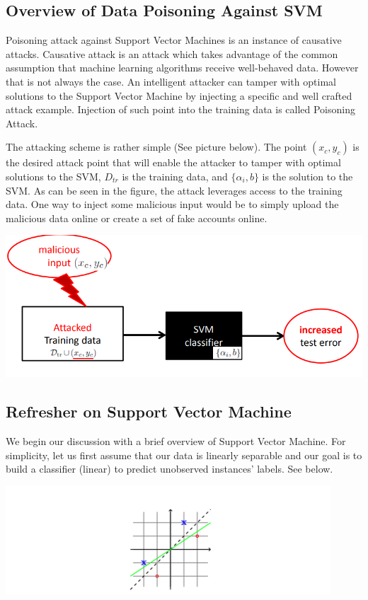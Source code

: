 \documentclass[twoside]{article}
\begin{document}
\subsection {Overview of Data Poisoning Against SVM}

Poisoning attack against Support Vector Machines is an instance of causative attacks. Causative attack is an attack which takes advantage of the common assumption that machine learning algorithms receive well-behaved data. However that is not always the case. An intelligent attacker can tamper with optimal solutions to the Support Vector Machine by injecting a specific and well crafted attack example. Injection of such point into the training data is called Poisoning Attack.


The attacking scheme is rather simple (See picture below). The point $(x_c,y_c)$ is the desired attack point that will enable the attacker to tamper with optimal solutions to the SVM, $D_{tr}$ is the training data, and $\{\alpha_i, b\}$ is the solution to the SVM. As can be seen in the figure, the attack leverages access to the training data. One way to inject some malicious input would be to simply upload the malicious data online or create a set of fake accounts online.

\begin{center}
    \includegraphics[scale=0.6]{poisoningpic.PNG}
\end{center}

\subsection{Refresher on Support Vector Machine}

We begin our discussion with a brief overview of Support Vector Machine. For simplicity, let us first assume that our data is linearly separable and our goal is to build a classifier (linear) to predict unobserved instances' labels. See below.

\begin{center}
    \includegraphics[scale=1.3]{bestseparation.PNG}
\end{center}
\end{document}
